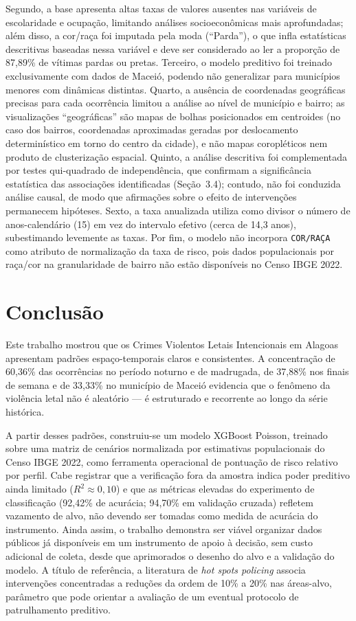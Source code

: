 \documentclass[12pt]{article}
\begin{document}
Segundo, a base apresenta altas taxas de valores ausentes nas variáveis de
escolaridade e ocupação, limitando análises socioeconômicas mais aprofundadas;
além disso, a cor/raça foi imputada pela moda (``Parda''), o que infla
estatísticas descritivas baseadas nessa variável e deve ser considerado ao
ler a proporção de 87,89\% de vítimas pardas ou pretas. Terceiro, o modelo
preditivo foi treinado exclusivamente com dados de Maceió, podendo não
generalizar para municípios menores com dinâmicas distintas. Quarto, a ausência
de coordenadas geográficas precisas para cada ocorrência limitou a análise ao
nível de município e bairro; as visualizações ``geográficas'' são mapas de
bolhas posicionados em centroides (no caso dos bairros, coordenadas
aproximadas geradas por deslocamento determinístico em torno do centro da
cidade), e não mapas coropléticos nem produto de clusterização espacial.
Quinto, a análise descritiva foi complementada por testes qui-quadrado de
independência, que confirmam a significância estatística das associações
identificadas (Seção~3.4); contudo, não foi conduzida análise causal, de modo
que afirmações sobre o efeito de intervenções permanecem hipóteses. Sexto, a
taxa anualizada utiliza como divisor o número de anos-calendário (15) em vez
do intervalo efetivo (cerca de 14,3 anos), subestimando levemente as taxas.
Por fim, o modelo não incorpora \texttt{COR/RAÇA} como atributo de
normalização da taxa de risco, pois dados populacionais por raça/cor na
granularidade de bairro não estão disponíveis no Censo IBGE 2022.

\section{Conclusão}
Este trabalho mostrou que os Crimes Violentos Letais Intencionais em
Alagoas apresentam padrões espaço-temporais claros e consistentes. A
concentração de 60,36\% das ocorrências no período noturno e de madrugada,
de 37,88\% nos finais de semana e de 33,33\% no município de Maceió evidencia
que o fenômeno da violência letal não é aleatório — é estruturado e recorrente
ao longo da série histórica.

A partir desses padrões, construiu-se um modelo XGBoost Poisson, treinado sobre
uma matriz de cenários normalizada por estimativas populacionais do Censo IBGE
2022, como ferramenta operacional de pontuação de risco relativo por perfil.
Cabe registrar que a verificação fora da amostra indica poder preditivo ainda
limitado ($R^2 \approx 0{,}10$) e que as métricas elevadas do experimento de
classificação (92,42\% de acurácia; 94,70\% em validação cruzada) refletem
vazamento de alvo, não devendo ser tomadas como medida de acurácia do
instrumento. Ainda assim, o trabalho demonstra ser viável organizar dados
públicos já disponíveis em um instrumento de apoio à decisão, sem custo
adicional de coleta, desde que aprimorados o desenho do alvo e a validação do
modelo. A título de referência, a literatura de \textit{hot spots policing}
associa intervenções concentradas a reduções da ordem de 10\% a 20\% nas
áreas-alvo, parâmetro que pode orientar a avaliação de um eventual protocolo de
patrulhamento preditivo.
\end{document}
